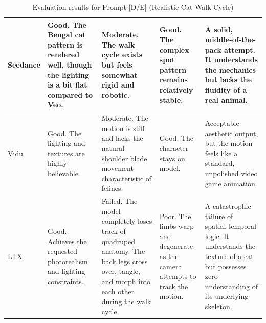 \documentclass[sigconf]{acmart}
\begin{document}
\begin{table}[t]
\begin{tabularx}{\textwidth}{| l | >{\raggedright\arraybackslash}X | >{\raggedright\arraybackslash}X | >{\raggedright\arraybackslash}X | >{\raggedright\arraybackslash}X |}
        Seedance       & Good. The Bengal cat pattern is rendered well, though the lighting is a bit flat compared to Veo. & Moderate. The walk cycle exists but feels somewhat rigid and robotic.                                                                                              & Good. The complex spot pattern remains relatively stable.                                     & A solid, middle-of-the-pack attempt. It understands the mechanics but lacks the fluidity of a real animal.                                         \\\hline
        Vidu           & Good. The lighting and textures are highly believable.                                            & Moderate. The motion is stiff and lacks the natural shoulder blade movement characteristic of felines.                                                             & Good. The character stays on model.                                                           & Acceptable aesthetic output, but the motion feels like a standard, unpolished video game animation.                                                \\\hline
        LTX            & Good. Achieves the requested photorealism and lighting constraints.                               & Failed. The model completely loses track of quadruped anatomy. The back legs cross over, tangle, and morph into each other during the walk cycle.                  & Poor. The limbs warp and degenerate as the camera attempts to track the motion.               & A catastrophic failure of spatial-temporal logic. It understands the texture of a cat but possesses zero understanding of its underlying skeleton. \\\hline
    \end{tabularx}
    \caption{Evaluation results for Prompt [D/E] (Realistic Cat Walk Cycle)}
    \label{tab:eval_prompt_6}
\end{table}
\end{document}
